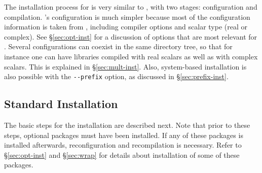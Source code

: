 	The installation process for \slepc is very similar to \petsc, with two stages: configuration and compilation. \slepc's configuration is much simpler because most of the configuration information is taken from \petsc, including compiler options and scalar type (real or complex). See \S\ref{sec:opt-inst} for a discussion of options that are most relevant for \slepc. Several configurations can coexist in the same directory tree, so that for instance one can have \slepc libraries compiled with real scalars as well as with complex scalars. This is explained in \S\ref{sec:mult-inst}. Also, system-based installation is also possible with the \Verb!--prefix! option, as discussed in \S\ref{sec:prefix-inst}.

\subsection{Standard Installation}
\label{sec:std-inst}

	The basic steps for the installation are described next. Note that prior to these steps, optional packages must have been installed. If any of these packages is installed afterwards, reconfiguration and recompilation is necessary. Refer to \S\ref{sec:opt-inst} and \S\ref{sec:wrap} for details about installation of some of these packages.

